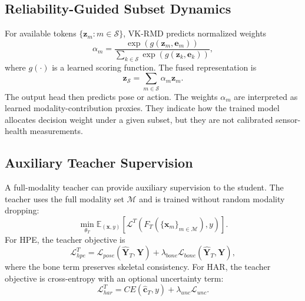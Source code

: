 ﻿\documentclass[journal]{IEEEtran}
\newcommand{\method}{VK-RMD}
\begin{document}
\subsection{Reliability-Guided Subset Dynamics}
For available tokens $\{\mathbf{z}_{m}:m\in\mathcal{S}\}$, \method{} predicts normalized weights
\begin{equation}
    \alpha_m = \frac{\exp(g(\mathbf{z}_{m},\mathbf{e}_{m}))}{\sum_{k\in\mathcal{S}}\exp(g(\mathbf{z}_{k},\mathbf{e}_{k}))},
\end{equation}
where $g(\cdot)$ is a learned scoring function. The fused representation is
\begin{equation}
    \mathbf{z}_{\mathcal{S}}=\sum_{m\in\mathcal{S}}\alpha_m\mathbf{z}_{m}.
\end{equation}
The output head then predicts pose or action. The weights $\alpha_m$ are interpreted as learned modality-contribution proxies. They indicate how the trained model allocates decision weight under a given subset, but they are not calibrated sensor-health measurements.

\subsection{Auxiliary Teacher Supervision}
A full-modality teacher can provide auxiliary supervision to the student. The teacher uses the full modality set $\mathcal{M}$ and is trained without random modality dropping:
\begin{equation}
    \min_{\theta_T}\mathbb{E}_{(\mathbf{x},y)}
    \left[
    \mathcal{L}^{T}(F_T(\{\mathbf{x}_m\}_{m\in\mathcal{M}}),y)
    \right].
\end{equation}
For HPE, the teacher objective is
\begin{equation}
    \mathcal{L}^{T}_{hpe}
    =
    \mathcal{L}_{pose}(\hat{\mathbf{Y}}_T,\mathbf{Y})
    +
    \lambda_{bone}\mathcal{L}_{bone}(\hat{\mathbf{Y}}_T,\mathbf{Y}),
\end{equation}
where the bone term preserves skeletal consistency. For HAR, the teacher objective is cross-entropy with an optional uncertainty term:
\begin{equation}
    \mathcal{L}^{T}_{har}
    =
    CE(\hat{\mathbf{c}}_T,y)+\lambda_{unc}\mathcal{L}_{unc}.
\end{equation}
\end{document}
